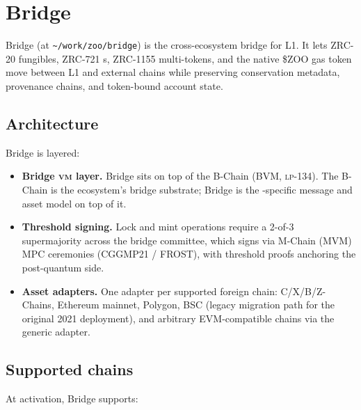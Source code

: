 \section{\Zoo{} Bridge}
\label{sec:zoo-bridge}

\Zoo{} Bridge (at \texttt{\textasciitilde/work/zoo/bridge}) is the
cross-ecosystem bridge for \Zoo{} L1. It lets ZRC-20 fungibles, ZRC-721
\NFT{}s, ZRC-1155 multi-tokens, and the native \$ZOO gas token move
between \Zoo{} L1 and external chains while preserving conservation
metadata, provenance chains, and token-bound account state.

\subsection{Architecture}

\Zoo{} Bridge is layered:

\begin{itemize}[leftmargin=1.2em]
  \item \textbf{Bridge \textsc{vm} layer.} \Zoo{} Bridge sits on top of
        the \Lux{} B-Chain (BVM, \textsc{lp-134}). The B-Chain is the
        \Lux{} ecosystem's bridge substrate; \Zoo{} Bridge is the
        \Zoo{}-specific message and asset model on top of it.
  \item \textbf{Threshold signing.} Lock and mint operations require a
        2-of-3 supermajority across the \Zoo{} bridge committee, which
        signs via M-Chain (MVM) MPC ceremonies (CGGMP21 / FROST), with
        \Ringtail{} threshold proofs anchoring the post-quantum side.
  \item \textbf{Asset adapters.} One adapter per supported foreign
        chain: \Lux{} C/X/B/Z-Chains, Ethereum mainnet, Polygon, BSC
        (legacy migration path for the original 2021 \Zoo{}
        deployment), and arbitrary EVM-compatible chains via the
        generic adapter.
\end{itemize}

\subsection{Supported chains}

At activation, \Zoo{} Bridge supports:


